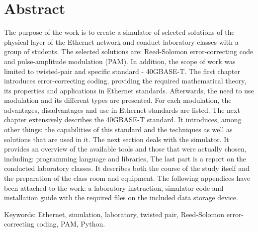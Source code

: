 \section{Abstract}

The purpose of the work is to create a simulator of selected solutions of the physical layer of the Ethernet network and conduct laboratory classes with a group of students. The selected solutions are: Reed-Solomon error-correcting code and pulse-amplitude modulation (PAM). In addition, the scope of work was limited to twisted-pair and specific standard - 40GBASE-T. The first chapter introduces error-correcting coding, providing the required mathematical theory, its properties and applications in Ethernet standards. Afterwards, the need to use modulation and its different types are presented. For each modulation, the advantages, disadvantages and use in Ethernet standards are listed. The next chapter extensively describes the 40GBASE-T standard. It introduces, among other things: the capabilities of this standard and the techniques as well as solutions that are used in it. The next section deals with the simulator. It provides an overview of the available tools and those that were actually chosen, including: programming language and libraries, The last part is a report on the conducted laboratory classes. It describes both the course of the study itself and the preparation of the class room and equipment. The following appendices have been attached to the work: a laboratory instruction, simulator code and installation guide with the required files on the included data storage device.

Keywords: Ethernet, simulation, laboratory, twisted pair, Reed-Solomon error-correcting coding, PAM, Python.